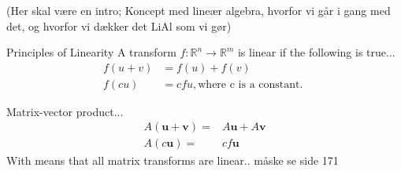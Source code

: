 (Her skal være en intro; Koncept med lineær algebra, hvorfor vi går i gang med det, og hvorfor vi dækker det LiAl som vi gør)

\begin{definition}{Principles of Linearity}
A transform $f: \mathbb{R}^n \rightarrow \mathbb{R}^m $ is linear if the following is true... 
\begin{align*}
f(u+v)&=f(u)+f(v)\\
f(c u)&=c f u ,  \text{where c is a constant. }
\end{align*}

Matrix-vector product...
\begin{align*}
A(\textbf{u}+\textbf{v})=& A\textbf{u}+A\textbf{v}\\
A(c \textbf{u})=& c f\textbf{u}
\end{align*}
With means that all matrix transforms are linear..
måske se side 171
\end{definition}

